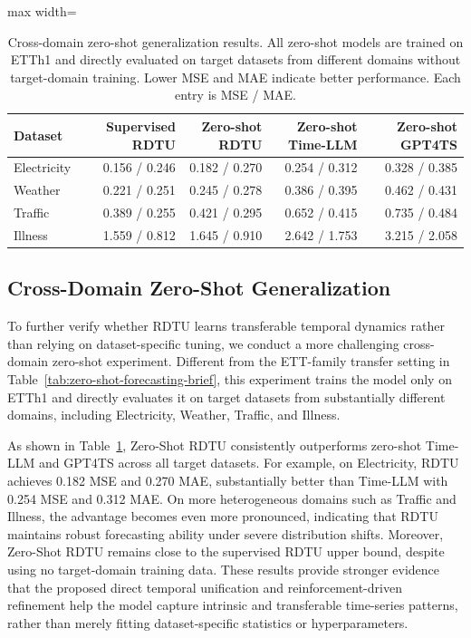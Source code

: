 \begin{table}[htbp]\centering\small
\caption{Cross-domain zero-shot generalization results. All zero-shot models are trained on ETTh1 and directly evaluated on target datasets from different domains without target-domain training. Lower MSE and MAE indicate better performance. Each entry is MSE / MAE.}\label{tab:cross_domain_zero_shot}
\setlength{\tabcolsep}{4pt}\renewcommand{\arraystretch}{1.25}
\begin{adjustbox}{max width=\linewidth}\begin{tabular}{lrrrr}\toprule
\textbf{Dataset} & \textbf{Supervised RDTU} & \textbf{Zero-shot RDTU} & \textbf{Zero-shot Time-LLM} & \textbf{Zero-shot GPT4TS}\\\midrule
Electricity & 0.156 / 0.246 & 0.182 / 0.270 & 0.254 / 0.312 & 0.328 / 0.385\\
Weather & 0.221 / 0.251 & 0.245 / 0.278 & 0.386 / 0.395 & 0.462 / 0.431\\
Traffic & 0.389 / 0.255 & 0.421 / 0.295 & 0.652 / 0.415 & 0.735 / 0.484\\
Illness & 1.559 / 0.812 & 1.645 / 0.910 & 2.642 / 1.753 & 3.215 / 2.058\\
\bottomrule\end{tabular}\end{adjustbox}\end{table}

\subsection{Cross-Domain Zero-Shot Generalization}
\label{sec:cross_domain_zero_shot}

To further verify whether RDTU learns transferable temporal dynamics rather than relying on dataset-specific tuning, we conduct a more challenging cross-domain zero-shot experiment.
Different from the ETT-family transfer setting in Table~\ref{tab:zero-shot-forecasting-brief}, this experiment trains the model only on ETTh1 and directly evaluates it on target datasets from substantially different domains, including Electricity, Weather, Traffic, and Illness.

As shown in Table~\ref{tab:cross_domain_zero_shot}, Zero-Shot RDTU consistently outperforms zero-shot Time-LLM and GPT4TS across all target datasets.
For example, on Electricity, RDTU achieves 0.182 MSE and 0.270 MAE, substantially better than Time-LLM with 0.254 MSE and 0.312 MAE.
On more heterogeneous domains such as Traffic and Illness, the advantage becomes even more pronounced, indicating that RDTU maintains robust forecasting ability under severe distribution shifts.
Moreover, Zero-Shot RDTU remains close to the supervised RDTU upper bound, despite using no target-domain training data.
These results provide stronger evidence that the proposed direct temporal unification and reinforcement-driven refinement help the model capture intrinsic and transferable time-series patterns, rather than merely fitting dataset-specific statistics or hyperparameters.
